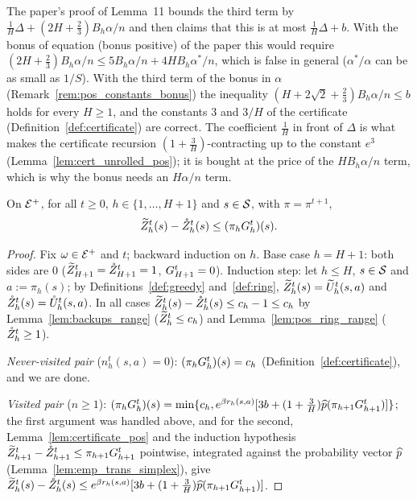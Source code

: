 \begin{remark}\label{rem:pos_constants_certificate}
The paper's proof of Lemma~11 bounds the third term by
$\frac1H\Delta + (2H + \frac23)B_h\alpha/n$ and then claims that this is at most $\frac1H\Delta + b$.
With the bonus of equation (bonus positive) of the paper this would require
$(2H + \frac23) B_h\alpha/n \le 5B_h\alpha/n + 4HB_h\alpha^*/n$, which is false in general
($\alpha^*/\alpha$ can be as small as $1/S$). With the third term of the bonus in $\alpha$
(Remark~\ref{rem:pos_constants_bonus}) the inequality $(H + 2\sqrt2 + \frac23) B_h \alpha/n \le b$
holds for every $H \ge 1$, and the constants $3$ and $3/H$ of the certificate
(Definition~\ref{def:certificate}) are correct. The coefficient $\frac1H$ in front of $\Delta$ is
what makes the certificate recursion $(1 + \frac3H)$-contracting up to the constant $e^3$
(Lemma~\ref{lem:cert_unrolled_pos}); it is bought at the price of the $HB_h\alpha/n$ term, which is
why the bonus needs an $H\alpha/n$ term.
\end{remark}

\begin{lemma}\label{lem:cert_dominates_gap_pos}
\leanok
{}
On $\mathcal{E}^+$, for all $t \ge 0$, $h \in \{1, \dots, H + 1\}$ and $s \in \mathcal{S}$, with $\pi = \pi^{t+1}$,
\[
  \widetilde{Z}_h^t(s) - \mathring{Z}_h^t(s) \le (\pi_hG_h^t)(s) .
\]
\end{lemma}

\begin{proof}
\leanok
Fix $\omega \in \mathcal{E}^+$ and $t$; backward induction on $h$. Base case $h = H + 1$: both sides
are $0$ ($\widetilde{Z}_{H+1}^t = \mathring{Z}_{H+1}^t = 1$, $G_{H+1}^t = 0$). Induction step: let $h \le H$, $s \in \mathcal{S}$
and $a := \pi_h(s)$; by Definitions~\ref{def:greedy} and~\ref{def:ring},
$\widetilde{Z}_h^t(s) = \widetilde{U}_h^t(s,a)$ and $\mathring{Z}_h^t(s) = \mathring{U}_h^t(s,a)$. In all cases
$\widetilde{Z}_h^t(s) - \mathring{Z}_h^t(s) \le c_h - 1 \le c_h$ by Lemma~\ref{lem:backups_range} ($\widetilde{Z}_h^t \le c_h$) and
Lemma~\ref{lem:pos_ring_range} ($\mathring{Z}_h^t \ge 1$).

\emph{Never-visited pair} ($n_h^t(s,a) = 0$): $(\pi_hG_h^t)(s) = c_h$ (Definition~\ref{def:certificate}),
and we are done.

\emph{Visited pair} ($n \ge 1$): $(\pi_hG_h^t)(s) = \min\{c_h, e^{\beta r_h(s,a)}[3b + (1 + \frac3H)\widehat{p}(\pi_{h+1}G_{h+1}^t)]\}$;
the first argument was handled above, and for the second, Lemma~\ref{lem:certificate_pos} and the
induction hypothesis $\widetilde{Z}^t_{h+1} - \mathring{Z}^t_{h+1} \le \pi_{h+1}G^t_{h+1}$ pointwise, integrated
against the probability vector $\widehat{p}$ (Lemma~\ref{lem:emp_trans_simplex}), give
$\widetilde{Z}_h^t(s) - \mathring{Z}_h^t(s) \le e^{\beta r_h(s,a)}[3b + (1 + \frac3H)\widehat{p}(\pi_{h+1}G^t_{h+1})]$.
\end{proof}

